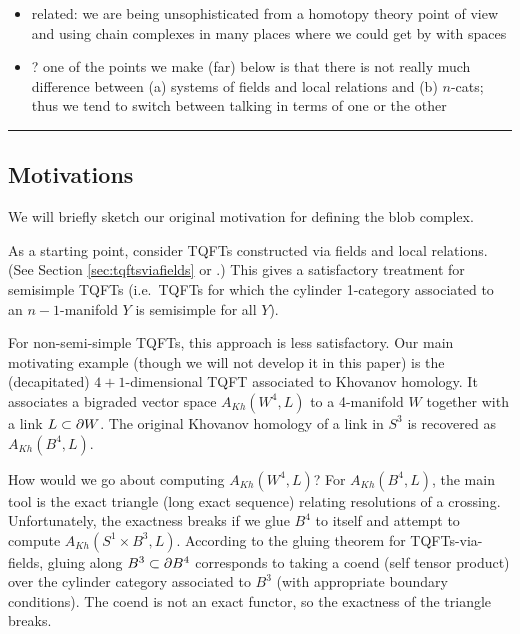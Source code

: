\begin{itemize}
\item related: we are being unsophisticated from a homotopy theory point of
view and using chain complexes in many places where we could get by with spaces
\item ? one of the points we make (far) below is that there is not really much
difference between (a) systems of fields and local relations and (b) $n$-cats;
thus we tend to switch between talking in terms of one or the other
\end{itemize}

\medskip\hrule\medskip

\subsection{Motivations}
\label{sec:motivations}

We will briefly sketch our original motivation for defining the blob complex.

As a starting point, consider TQFTs constructed via fields and local relations.
(See Section \ref{sec:tqftsviafields} or \cite{kw:tqft}.)
This gives a satisfactory treatment for semisimple TQFTs
(i.e.\ TQFTs for which the cylinder 1-category associated to an
$n{-}1$-manifold $Y$ is semisimple for all $Y$).

For non-semi-simple TQFTs, this approach is less satisfactory.
Our main motivating example (though we will not develop it in this paper)
is the (decapitated) $4{+}1$-dimensional TQFT associated to Khovanov homology.
It associates a bigraded vector space $A_{Kh}(W^4, L)$ to a 4-manifold $W$ together
with a link $L \subset \partial W$.
The original Khovanov homology of a link in $S^3$ is recovered as $A_{Kh}(B^4, L)$.

How would we go about computing $A_{Kh}(W^4, L)$?
For $A_{Kh}(B^4, L)$, the main tool is the exact triangle (long exact sequence)
relating resolutions of a crossing.
Unfortunately, the exactness breaks if we glue $B^4$ to itself and attempt
to compute $A_{Kh}(S^1\times B^3, L)$.
According to the gluing theorem for TQFTs-via-fields, gluing along $B^3 \subset \partial B^4$
corresponds to taking a coend (self tensor product) over the cylinder category
associated to $B^3$ (with appropriate boundary conditions).
The coend is not an exact functor, so the exactness of the triangle breaks.



